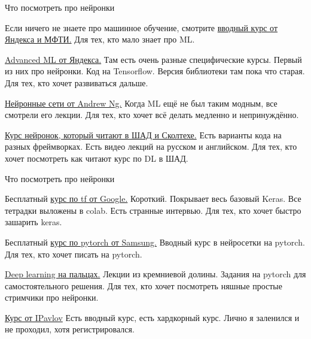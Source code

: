 \documentclass[notes,12pt, aspectratio=169]{beamer}
\newenvironment{wideitemize}{\itemize\addtolength{\itemsep}{10pt}}{\enditemize}
\begin{document}
\begin{frame}{Что посмотреть  про нейронки}
\begin{wideitemize}
\item Если ничего не знаете про машинное обучение, смотрите \href{https://www.coursera.org/specializations/machine-learning-data-analysis}{вводный курс от Яндекса и МФТИ.} \alert{Для тех, кто мало знает про ML.}

\item  \href{https://www.coursera.org/specializations/aml}{Advanced ML от Яндекса.} Там есть очень разные специфические курсы. Первый из них про нейронки. Код на Tensorflow. Версия библиотеки там пока что старая.  \alert{Для тех, кто хочет развиваться дальше.}

\item  \href{https://www.coursera.org/specializations/deep-learning} {Нейронные сети от Andrew Ng.} Когда ML ещё не был таким модным, все смотрели его лекции. \alert{Для тех, кто хочет всё делать медленно и непринуждённо.}

\item  \href{https://github.com/yandexdataschool/Practical_DL/tree/master}{Курс нейронок, который читают в ШАД и Сколтехе.} Есть варианты кода на разных фреймворках. Есть видео лекций на русском и английском. \alert{Для тех, кто хочет посмотреть как читают курс по DL  в ШАД.}
\end{wideitemize}
\end{frame}


\begin{frame}{Что посмотреть  про нейронки}
\begin{wideitemize}

	\item Бесплатный \href{https://www.udacity.com/course/intro-to-tensorflow-for-deep-learning--ud187}{курс по tf от Google.} Короткий. Покрывает весь базовый Keras. Все тетрадки выложены в colab. Есть странные интервью.  \alert{Для тех, кто  хочет быстро зашарить keras.}

	\item Бесплатный \href{https://stepik.org/course/50352/syllabus}{курс по pytorch от Samsung.}  Вводный курс в нейросетки на pytorch. \alert{Для тех, кто  хочет писать на pytorch.}

	\item  \href{https://dlcourse.ai}{Deep learning на пальцах.} Лекции из кремниевой долины. Задания на pytorch для самостоятельного решения.   \alert{Для тех, кто  хочет посмотреть няшные простые стримчики про нейронки.}

	\item \href{http://rusneuro.net/novosti/v-mfti-prohodit-kurs-theoretical-deep-learning-ot-ipavlov}{Курс от IPavlov} Есть вводный курс, есть хардкорный курс.  Лично я заленился и не проходил, хотя регистрировался.
\end{wideitemize}
\end{frame}
\end{document}
